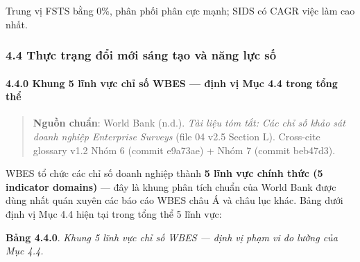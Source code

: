 \documentclass[12pt,a4paper]{article}
\begin{document}
Trung vị FSTS bằng 0\%, phân phối phân cực mạnh; SIDS có CAGR việc làm
cao nhất.

\hypertarget{44-thux1ef1c-trux1ea1ng-ux111ux1ed5i-mux1edbi-suxe1ng-tux1ea1o-vuxe0-nux103ng-lux1ef1c-sux1ed1}{%
\subsubsection{4.4 Thực trạng đổi mới sáng tạo và năng lực
số}\label{44-thux1ef1c-trux1ea1ng-ux111ux1ed5i-mux1edbi-suxe1ng-tux1ea1o-vuxe0-nux103ng-lux1ef1c-sux1ed1}}

\hypertarget{440-khung-5-lux129nh-vux1ef1c-chux1ec9-sux1ed1-wbes--ux111ux1ecbnh-vux1ecb-mux1ee5c-44-trong-tux1ed5ng-thux1ec3}{%
\paragraph{4.4.0 Khung 5 lĩnh vực chỉ số WBES --- định vị Mục 4.4 trong
tổng
thể}\label{440-khung-5-lux129nh-vux1ef1c-chux1ec9-sux1ed1-wbes--ux111ux1ecbnh-vux1ecb-mux1ee5c-44-trong-tux1ed5ng-thux1ec3}}

\begin{quote}
\textbf{Nguồn chuẩn}: World Bank (n.d.). \emph{Tài liệu tóm tắt: Các chỉ
số khảo sát doanh nghiệp Enterprise Surveys} (file 04 v2.5 Section L).
Cross-cite glossary v1.2 Nhóm 6 (commit e9a73ae) + Nhóm 7 (commit
beb47d3).
\end{quote}

WBES tổ chức các chỉ số doanh nghiệp thành \textbf{5 lĩnh vực chính thức
(5 indicator domains)} --- đây là khung phân tích chuẩn của World Bank
được dùng nhất quán xuyên các báo cáo WBES châu Á và châu lục khác. Bảng
dưới định vị Mục 4.4 hiện tại trong tổng thể 5 lĩnh vực:

\textbf{Bảng 4.4.0}. \emph{Khung 5 lĩnh vực chỉ số WBES --- định vị phạm
vi đo lường của Mục 4.4.}
\end{document}
